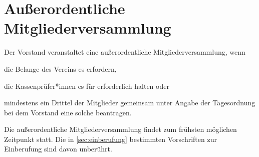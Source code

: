 \section{Außerordentliche Mitgliederversammlung}
\begin{absätze}
    \item Der Vorstand veranstaltet eine außerordentliche Mitgliederversammlung, wenn
    \begin{sätze}
        \item die Belange des Vereins es erfordern,
        \item die Kassenprüfer*innen es für erforderlich halten oder
        \item mindestens ein Drittel der Mitglieder gemeinsam unter Angabe der Tagesordnung bei dem Vorstand eine solche beantragen.
	\end{sätze}
\item Die außerordentliche Mitgliederversammlung findet zum frühsten möglichen Zeitpunkt statt. Die in \ref{sec:einberufung} bestimmten Vorschriften zur Einberufung sind davon unberührt.
\end{absätze}
